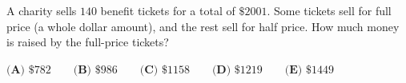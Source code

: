 A charity sells $140$ benefit tickets for a total of $\$2001$. Some tickets sell for full price (a whole dollar amount), and the rest sell for half price. How much money is raised by the full-price tickets?

$\textbf{(A) }\$782\qquad\textbf{(B) }\$986\qquad\textbf{(C) }\$1158\qquad\textbf{(D) }\$1219\qquad\textbf{(E) }\$1449$
